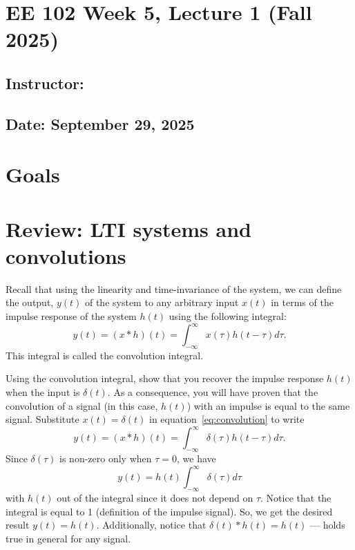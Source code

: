 \documentclass{ee102_notes}
\renewcommand{\releasedate}{September 29, 2025}
\begin{document}
\section*{EE 102 Week 5, Lecture 1 (Fall 2025)}
\subsection*{Instructor: \instructor}
\subsection*{Date: \releasedate}

\section{Goals}

\section{Review: LTI systems and convolutions}
Recall that using the linearity and time-invariance of the system, we can define the output, $y(t)$ of the system to any arbitrary input $x(t)$ in terms of the impulse response of the system $h(t)$ using the following integral:
\begin{equation}
y(t) = (x * h)(t) = \int_{-\infty}^{\infty} x(\tau) h(t - \tau) d\tau.
\label{eq:convolution}
\end{equation}
This integral is called the convolution integral. 
\begin{popquiz}
Using the convolution integral, show that you recover the impulse response $h(t)$ when the input is $\delta(t)$. As a consequence, you will have proven that the convolution of a signal (in this case, $h(t)$) with an impulse is equal to the same signal. 
\popqsplit
Substitute $x(t) = \delta(t)$ in equation~\eqref{eq:convolution} to write
\[
y(t) = (x * h)(t) = \int_{-\infty}^{\infty} \delta(\tau) h(t - \tau) d\tau.
\]
Since $\delta(\tau)$ is non-zero only when $\tau = 0$, we have 
\[
y(t) = h(t)\int_{-\infty}^{\infty} \delta(\tau) d\tau
\]
with $h(t)$ out of the integral since it does not depend on $\tau$. Notice that the integral is equal to 1 (definition of the impulse signal). So, we get the desired result $y(t) = h(t)$. Additionally, notice that $\delta(t) * h(t) = h(t)$ --- holds true in general for any signal.
\end{popquiz}
\end{document}
